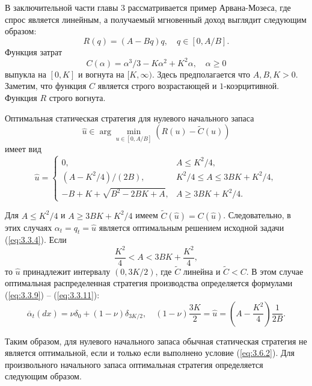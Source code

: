 В заключительной части главы 3 рассматривается пример Арвана-Мозеса, где спрос является линейным, а получаемый мгновенный доход выглядит следующим образом:
$$ R(q)=(A-Bq)q,\quad q\in [0,A/B].$$
Функция затрат
$$ C(\alpha)=\alpha^3/3-K\alpha^2+K^2\alpha,\quad \alpha\ge 0$$
выпукла на $[0,K]$ и вогнута на $[K,\infty)$. Здесь предполагается что $A, B, K>0$.
Заметим, что функция $C$ является строго возрастающей и $1$-коэрцитивной. Функция $R$ строго вогнута.

Оптимальная статическая стратегия для нулевого начального запаса 
$$ \widehat u\in\arg\min_{u\in [0,A/B]}(R(u)-\widetilde C(u))$$
имеет вид
\begin{equation} \label{eq:3.6.1}
\widehat u=\begin{cases}
0,& A\le K^2/4,\\
(A-K^2/4)/(2B),& K^2/4\le A\le 3BK+K^2/4,\\
-B+K+\sqrt{B^2-2BK+A},& A\ge 3BK+K^2/4.
\end{cases}
\end{equation}

Для $A\le K^2/4$ и $A\ge 3BK+K^2/4$ имеем $\widetilde C(\widehat u)=C(\widehat u)$. Следовательно, в этих случаях $\alpha_t=q_t=\widehat u$ является оптимальным решением исходной задачи (\ref{eq:3.3.4}). Если
\begin{equation} \label{eq:3.6.2}
\frac{K^2}{4}< A< 3BK+\frac{K^2}{4},
\end{equation}
то $\widehat u$ принадлежит интервалу $(0,3K/2)$, где $\widetilde C$ линейна и $\widetilde C<C$. В этом случае оптимальная распределенная стратегия производства определяется формулами (\ref{eq:3.3.9}) -- (\ref{eq:3.3.11}):
\begin{equation} \label{eq:3.6.3}
\overline\alpha_t(dx)=\nu\delta_0+(1-\nu)\delta_{3K/2},\quad (1-\nu)\frac{3K}{2}=\widehat u=\left(A-\frac{K^2}{4}\right)\frac{1}{2B}.
\end{equation}

Таким образом, для нулевого начального запаса обычная статическая стратегия не является оптимальной, если и только если выполнено условие (\ref{eq:3.6.2}). 
Для произвольного начального запаса оптимальная стратегия определяется следующим образом.

